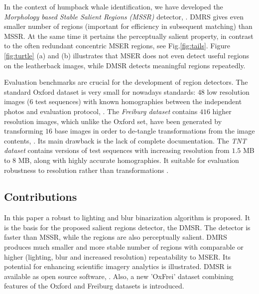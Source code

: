\documentclass{article}
\begin{document}
In the context of humpback whale identification, we have developed the {\em Morphology based Stable Salient Regions (MSSR)} detector, \cite{RangMSSR06, RangHumpb06}. DMRS gives even smaller number of regions (important for efficiency in subsequent matching) than MSSR. At the same time  it pertains the perceptually salient property, in contrast to the often redundant concentric MSER regions, see Fig.\ref{fig:tails}. Figure \ref{fig:turtle} (a) and (b) illustrates that MSER does not even detect useful regions on the leatherback images, while DMSR detects meaningful regions repeatedly.

Evaluation benchmarks are crucial for the development of region detectors. The standard Oxford dataset is very small for nowadays standards: $48$ low resolution images ($6$ test sequences) with known homographies between the independent photos and evaluation protocol, \cite{Mikolajczyk:2005}.  The {\em Freiburg dataset} contains $416$ higher resolution images, which unlike the Oxford set, have been generated by transforming $16$ base images in order to de-tangle transformations from the image contents, \cite{FischerDB14}. Its main drawback is the lack of complete documentation. The {\em TNT dataset} contains versions of test sequences with increasing resolution from $1.5$ MB to $8$ MB, along with highly accurate homographies. It suitable for evaluation robustness to resolution rather than transformations \cite{CorRos2013}. 

\subsection{Contributions}
\label{ssec:contr}

In this paper a robust to lighting and blur binarization algorithm is proposed. It is the basis for the proposed salient regions detector, the DMSR. The detector is faster than MSSR, while the regions are also perceptually salient. DMRS produces much smaller and more stable number of regions with comparable or higher (lighting, blur and increased resolution) repeatability to MSER. Its potential for enhancing scientific imagery analytics is illustrated. DMSR is available as open source software, \cite{git_repo}. Also, a new 'OxFrei' dataset combining features of the Oxford and Freiburg datasets is introduced. %
\end{document}
